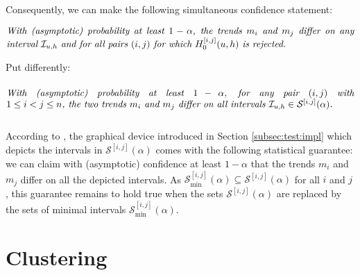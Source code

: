 \documentclass[a4paper,12pt]{article}
\makeatletter
\renewcommand{\eqref}[1]{\tagform@{\ref{#1}}}
\makeatother
\begin{document}
Consequently, we can make the following simultaneous confidence statement: 
\begin{equation}\label{eq:CS-v1}
\begin{minipage}[c][1.2cm][c]{13cm}
\textit{With (asymptotic) probability at least $1-\alpha$, the trends $m_i$ and $m_j$ differ on any interval $\interval$ and for all pairs $(i,j)$ for which $H_0^{[i, j]}(u, h)$ is rejected.}
\end{minipage}
\end{equation}
Put differently:
\begin{equation}\label{eq:CS-v2}
\begin{minipage}[c][1.45cm][c]{13cm}
\textit{With (asymptotic) probability at least $1-\alpha$, for any pair $(i,j)$ with \linebreak $1 \le i < j \le n$, the two trends $m_i$ and $m_j$ differ on all intervals $\interval \in \mathcal{S}^{[i, j]}(\alpha)$.}
\end{minipage}
\end{equation}


\begin{remark}
According to \eqref{eq:CS-v2}, the graphical device introduced in Section \ref{subsec:test:impl} which depicts the intervals in $\mathcal{S}^{[i, j]}(\alpha)$ comes with the following statistical guarantee: we can claim with (asymptotic) confidence at least $1-\alpha$ that the trends $m_i$ and $m_j$ differ on all the depicted intervals. As $\mathcal{S}^{[i, j]}_{\text{min}}(\alpha) \subseteq \mathcal{S}^{[i, j]}(\alpha)$ for all $i$ and $j$, this guarantee remains to hold true when the sets $\mathcal{S}^{[i, j]}(\alpha)$ are replaced by the sets of minimal intervals $\mathcal{S}_{\text{min}}^{[i, j]}(\alpha)$.
\end{remark}



\section{Clustering}\label{sec:clustering}
\end{document}

